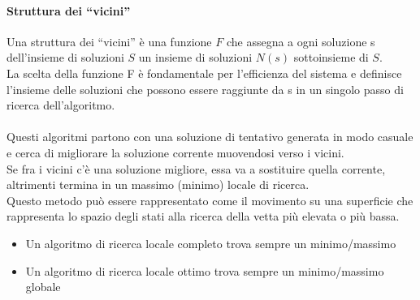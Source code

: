 \documentclass[../main.tex]{subfiles}
\begin{document}
	\paragraph{Struttura dei “vicini” }
	Una struttura dei “vicini” è una funzione $F$ che assegna a ogni soluzione s dell’insieme di soluzioni $S$ un insieme di soluzioni $N(s)$ sottoinsieme di $S$. \\
	La scelta della funzione F è fondamentale per l’efficienza del sistema e definisce l’insieme delle soluzioni che possono essere raggiunte da s in un singolo passo di ricerca dell’algoritmo.\\\\
	Questi algoritmi partono con una soluzione di tentativo generata in modo casuale e cerca di migliorare la soluzione corrente muovendosi verso i vicini. \\
	Se fra i vicini c’è una soluzione migliore, essa va a sostituire quella corrente, altrimenti termina in un massimo (minimo) locale di ricerca. \\
	Questo metodo può essere rappresentato come il movimento su una superficie che rappresenta lo spazio degli stati alla ricerca della vetta più elevata o più bassa.
	\begin{itemize}
		\item Un algoritmo di ricerca locale completo trova sempre un minimo/massimo
		\item Un algoritmo di ricerca locale ottimo trova sempre un minimo/massimo globale
	\end{itemize}
\end{document}
